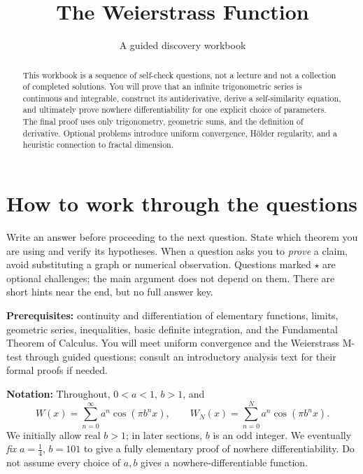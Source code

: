 \documentclass{workbook}
\title{The Weierstrass Function}
\subtitle{A guided discovery workbook}
\author{}
\date{}
\newcounter{question}
\begin{document}
\maketitle
\begin{abstract}
This workbook is a sequence of self-check questions, not a lecture and not a collection of completed solutions. You will prove that an infinite trigonometric series is continuous and integrable, construct its antiderivative, derive a self-similarity equation, and ultimately prove nowhere differentiability for one explicit choice of parameters. The final proof uses only trigonometry, geometric sums, and the definition of derivative. Optional problems introduce uniform convergence, H\"older regularity, and a heuristic connection to fractal dimension.
\end{abstract}

\section*{How to work through the questions}
Write an answer before proceeding to the next question. State which theorem you are using and verify its hypotheses. When a question asks you to \emph{prove} a claim, avoid substituting a graph or numerical observation. Questions marked $\star$ are optional challenges; the main argument does not depend on them. There are short hints near the end, but no full answer key.

\textbf{Prerequisites:} continuity and differentiation of elementary functions, limits, geometric series, inequalities, basic definite integration, and the Fundamental Theorem of Calculus. You will meet uniform convergence and the Weierstrass M-test through guided questions; consult an introductory analysis text for their formal proofs if needed.

\textbf{Notation:} Throughout, $0<a<1$, $b>1$, and
\[
  W(x)=\sum_{n=0}^\infty a^n\cos(\pi b^n x),\qquad
  W_N(x)=\sum_{n=0}^N a^n\cos(\pi b^n x).
\]
We initially allow real $b>1$; in later sections, $b$ is an odd integer. We eventually \emph{fix} $a=\tfrac14$, $b=101$ to give a fully elementary proof of nowhere differentiability. Do not assume every choice of $a,b$ gives a nowhere-differentiable function.
\end{document}
